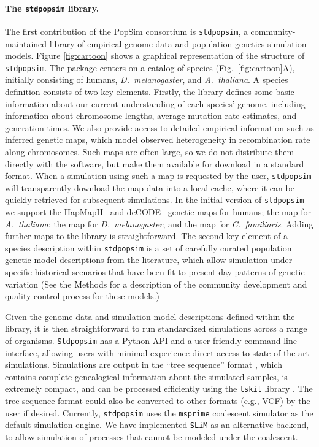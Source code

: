 \documentclass[12pt,halfline,a4paper]{ouparticle}
\newcommand{\Stdpopsim}{\texttt{Stdpopsim}\xspace}
\newcommand{\stdpopsim}{\texttt{stdpopsim}\xspace}
\newcommand{\tskit}{\texttt{tskit}\xspace}
\begin{document}
\paragraph{The \stdpopsim library.}
The first contribution of the PopSim consortium is \stdpopsim, a
community-maintained library of empirical genome data and population genetics simulation
models. Figure \ref{fig:cartoon} shows a graphical
representation of the structure of \stdpopsim. The package centers
on a catalog of species (Fig.~\ref{fig:cartoon}A), initially consisting of humans,
\textit{D.~melanogaster}, and \textit{A.~thaliana}.
A species definition consists of two key elements.
Firstly, the library defines some basic information about our current understanding of each 
species' genome, including information about chromosome
lengths, average mutation rate estimates, and generation times.
We also provide access to detailed empirical information such as inferred genetic maps,
which model observed heterogeneity in recombination rate along chromosomes.
Such maps are often large,
so we do not distribute them directly with the software, but make them available
for download in a standard format.
When a simulation using such a map is requested by the user,
\stdpopsim will transparently download the map data into a local cache,
where it can be quickly retrieved for subsequent simulations.
In the initial version of \stdpopsim we support
the HapMapII~\citep{international2007second} and
deCODE~\citep{kong2010fine} genetic maps for humans;
the \cite{salome2011recombination} map for \textit{A.~thaliana};
the \cite{comeron2012many} map for \textit{D.~melanogaster},
and the \cite{campbell2016pedigree} map for \textit{C.~familiaris}.
Adding further maps to the library is straightforward.
The second key element of a species description
within \stdpopsim is a set of carefully curated population genetic model
descriptions from the literature, which allow simulation under
specific historical scenarios that have been fit to present-day patterns of
genetic variation (See the Methods for a description of the community
development and quality-control process for these models.)

Given the genome data and simulation model descriptions defined within the
library, it is then straightforward to run standardized simulations
across a range of organisms. \Stdpopsim has a Python API and a user-friendly
command line interface, allowing users with minimal experience direct access to
state-of-the-art simulations. Simulations are output in the ``tree sequence''
format \citep{kelleher2016efficient,kelleher2018efficient,kelleher2019inferring}, which
contains complete genealogical information about the simulated samples, is
extremely compact, and can be processed efficiently using the \tskit library
\citep{kelleher2016efficient,kelleher2018efficient}.
The tree sequence format could also be converted
to other formats (e.g., VCF) by the user if desired.
Currently, \stdpopsim uses the  \texttt{msprime} coalescent simulator \citep{kelleher2016efficient}
as the default simulation engine.
We have implemented \texttt{SLiM} \citep{haller2019tree,haller2019slim}
as an alternative backend,
to allow simulation of processes that cannot be modeled under the coalescent.
\end{document}
